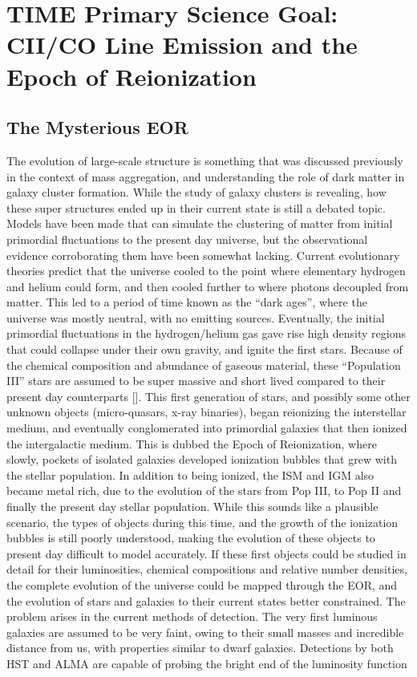 \documentclass[manuscript]{aastex}
\begin{document}
\section{TIME Primary Science Goal: CII/CO Line Emission and the Epoch of Reionization}
\subsection{The Mysterious EOR}

The evolution of large-scale structure is something that was discussed previously in the context of mass aggregation, and understanding the role of dark matter in galaxy cluster formation. While the study of galaxy clusters is revealing, how these super structures ended up in their current state is still a debated topic. Models have been made that can simulate the clustering of matter from initial primordial fluctuations to the present day universe, but the observational evidence corroborating them have been somewhat lacking. Current evolutionary theories predict that the universe cooled to the point where elementary hydrogen and helium could form, and then cooled further to where photons decoupled from matter. This led to a period of time known as the ``dark ages'', where the universe was mostly neutral, with no emitting sources. Eventually, the initial primordial fluctuations in the hydrogen/helium gas gave rise high density regions that could collapse under their own gravity, and ignite the first stars. Because of the chemical composition and abundance of gaseous material, these ``Population III'' stars are assumed to be super massive and short lived compared to their present day counterparts [\cite{Zaroubi2012}]. This first generation of stars, and possibly some other unknown objects (micro-quasars, x-ray binaries), began reionizing the interstellar medium, and eventually conglomerated into primordial galaxies that then ionized the intergalactic medium. This is dubbed the Epoch of Reionization, where slowly, pockets of isolated galaxies developed ionization bubbles that grew with the stellar population. In addition to being ionized, the ISM and IGM also became metal rich, due to the evolution of the stars from Pop III, to Pop II and finally the present day stellar population. While this sounds like a plausible scenario, the types of objects during this time, and the growth of the ionization bubbles is still poorly understood, making the evolution of these objects to present day difficult to model accurately. If these first objects could be studied in detail for their luminosities, chemical compositions and relative number densities, the complete evolution of the universe could be mapped through the EOR, and the evolution of stars and galaxies to their current states better constrained. The problem arises in the current methods of detection. The very first luminous galaxies are assumed to be very faint, owing to their small masses and incredible distance from us, with properties similar to dwarf galaxies. Detections by both HST and ALMA are capable of probing the bright end of the luminosity function 
\end{document}
